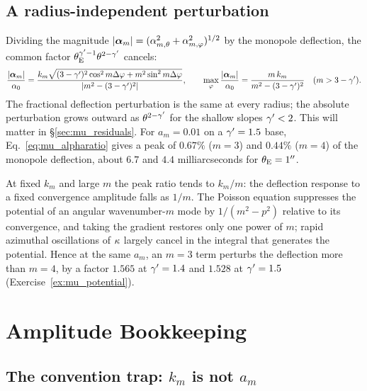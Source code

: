 \subsection{A radius-independent perturbation}
\label{sec:mu_ratio}

Dividing the magnitude $|\boldsymbol{\alpha}_m| = (\alpha_{m,\theta}^2 +
\alpha_{m,\varphi}^2)^{1/2}$ by the monopole deflection, the common
factor $\theta_{\mathrm{E}}^{\gamma'-1}\theta^{2-\gamma'}$ cancels:
\begin{equation}
    \frac{|\boldsymbol{\alpha}_m|}{\alpha_0}
    = \frac{k_m\sqrt{(3-\gamma')^{2}\cos^{2}m\Delta\varphi + m^{2}\sin^{2}m\Delta\varphi}}
           {|m^{2}-(3-\gamma')^{2}|},
    \qquad
    \max_\varphi\frac{|\boldsymbol{\alpha}_m|}{\alpha_0} = \frac{m\,k_m}{m^{2}-(3-\gamma')^{2}}
    \quad (m > 3-\gamma').
    \label{eq:mu_alpharatio}
\end{equation}
The fractional deflection perturbation is the same at every
radius; the absolute perturbation grows outward as
$\theta^{2-\gamma'}$ for the shallow slopes $\gamma'<2$.  This will matter in
\S\ref{sec:mu_residuals}.  For $a_m = 0.01$ on a $\gamma'=1.5$ base,
Eq.~\eqref{eq:mu_alpharatio} gives a peak of $0.67\%$ ($m=3$) and
$0.44\%$ ($m=4$) of the monopole deflection, about $6.7$ and $4.4$
milliarcseconds for $\theta_{\mathrm{E}}=1''$.

\begin{annotation}
At fixed $k_m$ and large $m$ the peak ratio tends to $k_m/m$: the
deflection response to a fixed convergence amplitude falls as
$1/m$.  The Poisson equation suppresses the potential of an angular
wavenumber-$m$ mode by $1/(m^2-p^2)$ relative to its convergence, and
taking the gradient restores only one power of $m$; rapid
azimuthal oscillations of $\kappa$ largely cancel in the integral that
generates the potential.  Hence at the same $a_m$, an $m=3$ term
perturbs the deflection more than $m=4$, by a factor $1.565$ at
$\gamma'=1.4$ and $1.528$ at $\gamma'=1.5$ (Exercise~\ref{ex:mu_potential}).
\end{annotation}


\section{Amplitude Bookkeeping}
\label{sec:mu_convention}

\subsection{The convention trap: \texorpdfstring{$k_m$}{k\_m} is not \texorpdfstring{$a_m$}{a\_m}}

